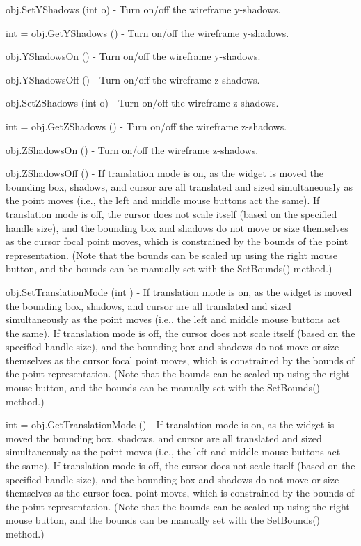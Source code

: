 \begin{DoxyItemize}
\item {\ttfamily obj.\-Set\-Y\-Shadows (int o)} -\/ Turn on/off the wireframe y-\/shadows.  
\item {\ttfamily int = obj.\-Get\-Y\-Shadows ()} -\/ Turn on/off the wireframe y-\/shadows.  
\item {\ttfamily obj.\-Y\-Shadows\-On ()} -\/ Turn on/off the wireframe y-\/shadows.  
\item {\ttfamily obj.\-Y\-Shadows\-Off ()} -\/ Turn on/off the wireframe z-\/shadows.  
\item {\ttfamily obj.\-Set\-Z\-Shadows (int o)} -\/ Turn on/off the wireframe z-\/shadows.  
\item {\ttfamily int = obj.\-Get\-Z\-Shadows ()} -\/ Turn on/off the wireframe z-\/shadows.  
\item {\ttfamily obj.\-Z\-Shadows\-On ()} -\/ Turn on/off the wireframe z-\/shadows.  
\item {\ttfamily obj.\-Z\-Shadows\-Off ()} -\/ If translation mode is on, as the widget is moved the bounding box, shadows, and cursor are all translated and sized simultaneously as the point moves (i.\-e., the left and middle mouse buttons act the same). If translation mode is off, the cursor does not scale itself (based on the specified handle size), and the bounding box and shadows do not move or size themselves as the cursor focal point moves, which is constrained by the bounds of the point representation. (Note that the bounds can be scaled up using the right mouse button, and the bounds can be manually set with the Set\-Bounds() method.)  
\item {\ttfamily obj.\-Set\-Translation\-Mode (int )} -\/ If translation mode is on, as the widget is moved the bounding box, shadows, and cursor are all translated and sized simultaneously as the point moves (i.\-e., the left and middle mouse buttons act the same). If translation mode is off, the cursor does not scale itself (based on the specified handle size), and the bounding box and shadows do not move or size themselves as the cursor focal point moves, which is constrained by the bounds of the point representation. (Note that the bounds can be scaled up using the right mouse button, and the bounds can be manually set with the Set\-Bounds() method.)  
\item {\ttfamily int = obj.\-Get\-Translation\-Mode ()} -\/ If translation mode is on, as the widget is moved the bounding box, shadows, and cursor are all translated and sized simultaneously as the point moves (i.\-e., the left and middle mouse buttons act the same). If translation mode is off, the cursor does not scale itself (based on the specified handle size), and the bounding box and shadows do not move or size themselves as the cursor focal point moves, which is constrained by the bounds of the point representation. (Note that the bounds can be scaled up using the right mouse button, and the bounds can be manually set with the Set\-Bounds() method.)  

\end{DoxyItemize}

